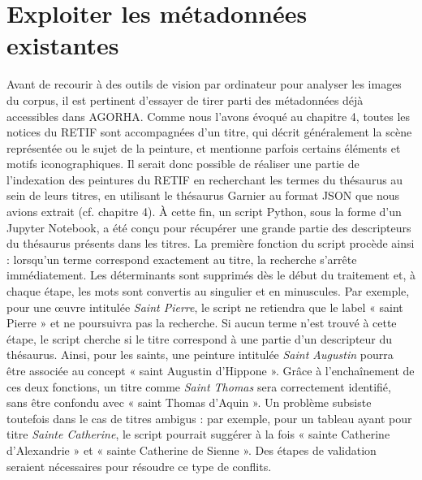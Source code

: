 \section{Exploiter les métadonnées existantes}
Avant de recourir à des outils de vision par ordinateur pour analyser les images du corpus, il est pertinent d’essayer de tirer parti des métadonnées déjà accessibles dans AGORHA. Comme nous l’avons évoqué au chapitre 4, toutes les notices du RETIF sont accompagnées d’un titre, qui décrit généralement la scène représentée ou le sujet de la peinture, et mentionne parfois certains éléments et motifs iconographiques. Il serait donc possible de réaliser une partie de l’indexation des peintures du RETIF en recherchant les termes du thésaurus au sein de leurs titres, en utilisant le thésaurus Garnier au format JSON que nous avions extrait (cf. chapitre 4). À cette fin, un script Python, sous la forme d’un Jupyter Notebook, a été conçu pour récupérer une grande partie des descripteurs du thésaurus présents dans les titres. La première fonction du script procède ainsi : lorsqu’un terme correspond exactement au titre, la recherche s’arrête immédiatement. Les déterminants sont supprimés dès le début du traitement et, à chaque étape, les mots sont convertis au singulier et en minuscules. Par exemple, pour une œuvre intitulée \textit{Saint Pierre}, le script ne retiendra que le label « saint Pierre » et ne poursuivra pas la recherche. Si aucun terme n’est trouvé à cette étape, le script cherche si le titre correspond à une partie d’un descripteur du thésaurus. Ainsi, pour les saints, une peinture intitulée \textit{Saint Augustin} pourra être associée au concept « saint Augustin d’Hippone ». Grâce à l’enchaînement de ces deux fonctions, un titre comme \textit{Saint Thomas} sera correctement identifié, sans être confondu avec « saint Thomas d’Aquin ». Un problème subsiste toutefois dans le cas de titres ambigus : par exemple, pour un tableau ayant pour titre \textit{Sainte Catherine}, le script pourrait suggérer à la fois « sainte Catherine d’Alexandrie » et « sainte Catherine de Sienne ». Des étapes de validation seraient nécessaires pour résoudre ce type de conflits.

